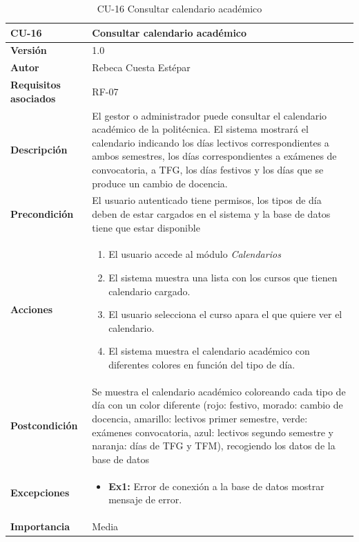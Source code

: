 \begin{table}[p]
	\centering
	\begin{tabularx}{\linewidth}{ p{} p{} }
		\toprule
		\textbf{CU-16}    & \textbf{Consultar calendario académico}\\
		\toprule
		\textbf{Versión}              & 1.0    \\
		\textbf{Autor}                & Rebeca Cuesta Estépar \\
		\textbf{Requisitos asociados} & RF-07 \\
		\textbf{Descripción}          & El gestor o administrador puede consultar el calendario académico de la politécnica. El sistema mostrará el calendario indicando los días lectivos correspondientes a ambos semestres, los días correspondientes a exámenes de convocatoria, a TFG, los días festivos y los días que se produce un cambio de docencia.  \\
		\textbf{Precondición}         &  El usuario autenticado tiene permisos, los tipos de día deben de estar cargados en el sistema y la base de datos tiene que estar disponible \\
		\textbf{Acciones}             &
		\begin{enumerate}
			\def\labelenumi{\arabic{enumi}.}
			\tightlist
			\item El usuario accede al módulo \emph{Calendarios}
			\item El sistema muestra una lista con los cursos que tienen calendario cargado.
			\item El usuario selecciona el curso apara el que quiere ver el calendario.
			\item El sistema muestra el calendario académico con diferentes colores en función del tipo de día.
		\end{enumerate}\\
		\textbf{Postcondición} & Se muestra el calendario académico coloreando cada tipo de día con un color diferente (rojo: festivo, morado: cambio de docencia, amarillo: lectivos primer semestre, verde: exámenes convocatoria, azul: lectivos segundo semestre y naranja: días de TFG y TFM), recogiendo los datos de la base de datos        \\
		\textbf{Excepciones}          & 
		\begin{itemize}[itemsep=0.15em, parsep=0pt, topsep=0pt, leftmargin=*]
			\tightlist
			\item \textbf{Ex1:} Error de conexión a la base de datos \textrightarrow mostrar mensaje de error. 
		\end{itemize} \\
		\textbf{Importancia}          & Media \\
		\bottomrule
	\end{tabularx}
	\caption{CU-16 Consultar calendario académico}
\end{table}


